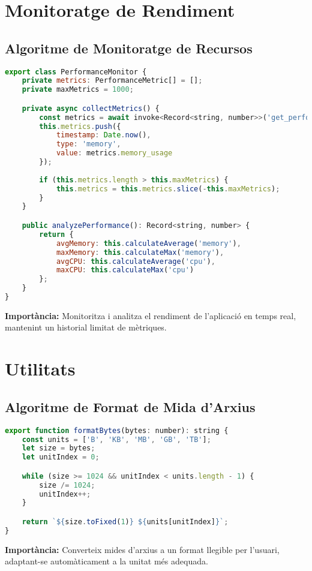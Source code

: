 \section{Monitoratge de Rendiment}

\subsection{Algoritme de Monitoratge de Recursos}
\begin{lstlisting}[language=JavaScript]
export class PerformanceMonitor {
    private metrics: PerformanceMetric[] = [];
    private maxMetrics = 1000;

    private async collectMetrics() {
        const metrics = await invoke<Record<string, number>>('get_performance_metrics');
        this.metrics.push({
            timestamp: Date.now(),
            type: 'memory',
            value: metrics.memory_usage
        });
        
        if (this.metrics.length > this.maxMetrics) {
            this.metrics = this.metrics.slice(-this.maxMetrics);
        }
    }

    public analyzePerformance(): Record<string, number> {
        return {
            avgMemory: this.calculateAverage('memory'),
            maxMemory: this.calculateMax('memory'),
            avgCPU: this.calculateAverage('cpu'),
            maxCPU: this.calculateMax('cpu')
        };
    }
}
\end{lstlisting}
\textbf{Importància:} Monitoritza i analitza el rendiment de l'aplicació en temps real, mantenint un historial limitat de mètriques.

\section{Utilitats}

\subsection{Algoritme de Format de Mida d'Arxius}
\begin{lstlisting}[language=JavaScript]
export function formatBytes(bytes: number): string {
    const units = ['B', 'KB', 'MB', 'GB', 'TB'];
    let size = bytes;
    let unitIndex = 0;

    while (size >= 1024 && unitIndex < units.length - 1) {
        size /= 1024;
        unitIndex++;
    }

    return `${size.toFixed(1)} ${units[unitIndex]}`;
}
\end{lstlisting}
\textbf{Importància:} Converteix mides d'arxius a un format llegible per l'usuari, adaptant-se automàticament a la unitat més adequada.

